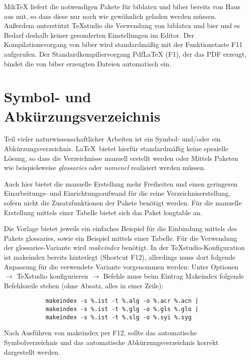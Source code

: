 		MikTeX liefert die notwendigen Pakete für biblatex und biber bereits von Haus aus mit, so dass diese nur noch wie gewöhnlich geladen werden müssen. Außerdem unterstützt TeXstudio die Verwendung von biblatex und bier und es Bedarf deshalb keiner gesonderten Einstellungen im Editor. Der Kompilationsvorgang von biber wird standardmäßig mit der Funktionstaste F11 aufgerufen. Der Standardkompiliervorgang PdfLaTeX (F1), der das PDF erzeugt, bindet die von biber erzeugten Dateien automatisch ein.
		
	\section{Symbol- und Abkürzungsverzeichnis}
		Teil vieler naturwissenschaftlicher Arbeiten ist ein Symbol- und/oder ein Abkürzungsverzeichnis. \LaTeX\ bietet hierfür standardmäßig keine spezielle Lösung, so dass die Verzeichnisse manuell erstellt werden oder Mittels Paketen wie beispielsweise \textit{glossaries} oder \textit{nomencl} realisiert werden müssen.
		
		Auch hier bietet die manuelle Erstellung mehr Freiheiten und einen geringeren Einarbeitungs- und Einrichtungsaufwand für die reine Verzeichniserstellung, sofern nicht die Zusatzfunktionen der Pakete benötigt werden. Für die manuelle Erstellung mittels einer Tabelle bietet sich das Paket longtable an.
		
		Die Vorlage bietet jeweils ein einfaches Beispiel für die Einbindung mittels des Pakets glossaries, sowie ein Beispiel mittels einer Tabelle. Für die Verwendung der glossaries-Variante wird \textit{makeindex} benötigt. In der TeXstudio-Konfiguration ist makeindex bereits hinterlegt (Shortcut F12), allerdings muss dort folgende Anpassung für die verwendete Variante vorgenommen werden:\newline
		Unter Optionen $\rightarrow$ TeXstudio konfigurieren $\rightarrow$ Befehle muss beim Eintrag Makeindex folgende Befehlszeile stehen (ohne Absatz, alles in einer Zeile): 
		\begin{verbatim}
			makeindex -s %.ist -t %.alg -o %.acr %.acn | 
			makeindex -s %.ist -t %.glg -o %.gls %.glo | 
			makeindex -s %.ist -t %.slg -o %.syi %.syg
		\end{verbatim}
		Nach Ausführen von makeindex per F12, sollte das automatische Symbolverzeichnis und das automatische Abkürzungsverzeichnis korrekt dargestellt werden.
		
